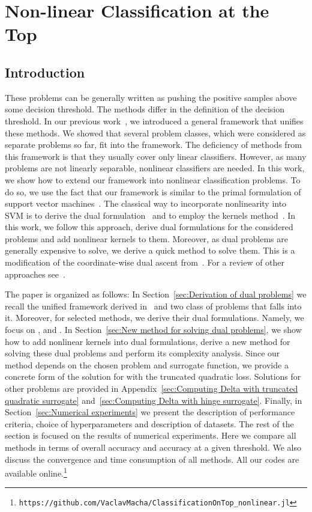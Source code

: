 \chapter{Non-linear Classification at the Top}

\section{Introduction}

These problems can be generally written as pushing the positive samples above some decision threshold. The methods differ in the definition of the decision threshold. In our previous work~\cite{adam2019patmat}, we introduced a general framework that unifies these methods. We showed that several problem classes, which were considered as separate problems so far, fit into the framework. The deficiency of methods from this framework is that they usually cover only linear classifiers. However, as many problems are not linearly separable, nonlinear classifiers are needed. In this work, we show how to extend our framework into nonlinear classification problems. To do so, we use the fact that our framework is similar to the primal formulation of support vector machines~\cite{cortes1995support}. The classical way to incorporate nonlinearity into SVM is to derive the dual formulation~\cite{boyd2004convex} and to employ the kernels method~\cite{scholkopf2001learning}. In this work, we follow this approach, derive dual formulations for the considered problems and add nonlinear kernels to them. Moreover, as dual problems are generally expensive to solve, we derive a quick method to solve them. This is a modification of the coordinate-wise dual ascent from~\cite{hsieh2008dual}. For a review of other approaches see~\cite{batmaz2019review,werner2019review}.

The paper is organized as follows: In Section~\ref{sec:Derivation of dual problems} we recall the unified framework derived in~\cite{adam2019patmat} and two class of problems that falls into it. Moreover, for selected methods, we derive their dual formulations. Namely, we focus on \TopPush, \TopPushK and \PatMat. In Section~\ref{sec:New method for solving dual problems}, we show how to add nonlinear kernels into dual formulations, derive a new method for solving these dual problems and perform its complexity analysis. Since our method depends on the chosen problem and surrogate function, we provide a concrete form of the solution for \TopPushK with the truncated quadratic loss. Solutions for other problems are provided in Appendix~\ref{sec:Computing Delta with truncated quadratic surrogate} and~\ref{sec:Computing Delta with hinge surrogate}. Finally, in Section~\ref{sec:Numerical experiments} we present the description of performance criteria, choice of hyperparameters and description of datasets. The rest of the section is focused on the results of numerical experiments. Here we compare all methods in terms of overall accuracy and accuracy at a given threshold. We also discuss the convergence and time consumption of all methods. All our codes are available online.\footnote{\texttt{https://github.com/VaclavMacha/ClassificationOnTop\_nonlinear.jl}}

